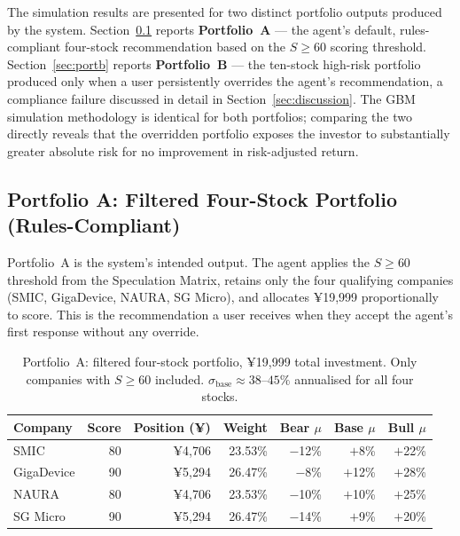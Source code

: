 \documentclass[11pt,a4paper]{article}
\begin{document}
The simulation results are presented for two distinct portfolio outputs
produced by the system. Section~\ref{sec:porta} reports
\textbf{Portfolio~A} --- the agent's default, rules-compliant
four-stock recommendation based on the $S \geq 60$ scoring threshold.
Section~\ref{sec:portb} reports \textbf{Portfolio~B} --- the ten-stock
high-risk portfolio produced only when a user persistently overrides the
agent's recommendation, a compliance failure discussed in detail in
Section~\ref{sec:discussion}. The GBM simulation methodology is
identical for both portfolios; comparing the two directly reveals that
the overridden portfolio exposes the investor to substantially greater
absolute risk for no improvement in risk-adjusted return.

\subsection{Portfolio A: Filtered Four-Stock Portfolio (Rules-Compliant)}
\label{sec:porta}

Portfolio~A is the system's intended output. The agent applies the
$S \geq 60$ threshold from the Speculation Matrix, retains only the
four qualifying companies (SMIC, GigaDevice, NAURA, SG Micro), and
allocates ¥19,999 proportionally to score. This is the recommendation
a user receives when they accept the agent's first response without
any override.

\begin{table}[h!]
  \centering
  \caption{Portfolio~A: filtered four-stock portfolio, ¥19,999 total
           investment. Only companies with $S \geq 60$ included.
           $\sigma_{\text{base}} \approx 38$--$45\%$ annualised for
           all four stocks.}
  \label{tab:portfolio_a}
  \begin{tabular}{lrrrrrr}
    \toprule
    \textbf{Company} & \textbf{Score} & \textbf{Position (¥)} & \textbf{Weight}
      & \textbf{Bear $\mu$} & \textbf{Base $\mu$} & \textbf{Bull $\mu$} \\
    \midrule
    SMIC       & 80 & ¥4,706 & 23.53\% & $-$12\% & $+$8\%  & $+$22\% \\
    GigaDevice & 90 & ¥5,294 & 26.47\% & $-$8\%  & $+$12\% & $+$28\% \\
    NAURA      & 80 & ¥4,706 & 23.53\% & $-$10\% & $+$10\% & $+$25\% \\
    SG Micro   & 90 & ¥5,294 & 26.47\% & $-$14\% & $+$9\%  & $+$20\% \\
    \bottomrule
  \end{tabular}
\end{table}
\end{document}
